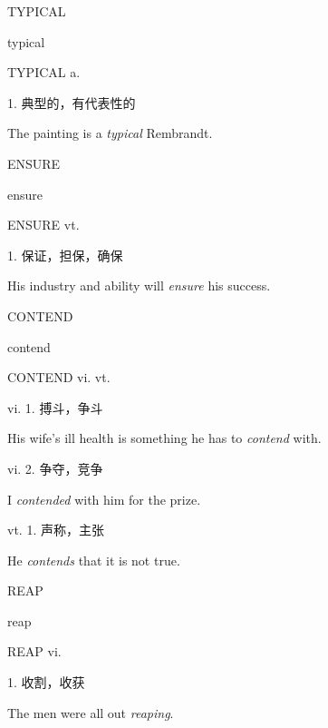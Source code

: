 \begin{flashcard}{
TYPICAL

typical
}
\begin{center}
TYPICAL a. 
\end{center}
1. 典型的，有代表性的

The painting is a \textit{typical} Rembrandt.

\end{flashcard}
\begin{flashcard}{
ENSURE

ensure
}
\begin{center}
ENSURE vt. 
\end{center}
1. 保证，担保，确保

His industry and ability will \textit{ensure} his success.

\end{flashcard}
\begin{flashcard}{
CONTEND

contend
}
\begin{center}
CONTEND vi. vt. 
\end{center}
vi. 1. 搏斗，争斗

His wife's ill health is something he has to \textit{contend} with.

vi. 2. 争夺，竞争

I \textit{contended} with him for the prize.

vt. 1. 声称，主张

He \textit{contends} that it is not true.

\end{flashcard}
\begin{flashcard}{
REAP

reap
}
\begin{center}
REAP vi. \textipa{[ri\textlengthmark p]}
\end{center}
1. 收割，收获

The men were all out \textit{reaping}.

\end{flashcard}
